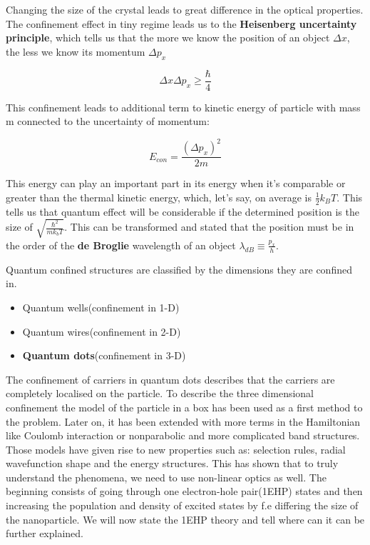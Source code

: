 Changing the size of the crystal leads to great difference in the optical properties. The confinement effect in tiny regime leads us to the \textbf{Heisenberg uncertainty principle}, which tells us that the more we know the position of an object $\Delta x$, the less we know its momentum $\Delta p_x$

\begin{equation}
\Delta x \Delta p_x \geq \frac{\hbar}{4}
\end{equation}

This confinement leads to additional term to kinetic energy of particle with mass m connected to the uncertainty of momentum:

\begin{equation}
E_{con} = \frac{(\Delta p_x)^2}{2m}
\end{equation}

This energy can play an important part in its energy when it's comparable or greater than the thermal kinetic energy, which, let's say, on average is $\frac{1}{2}k_BT$.
This tells us that quantum effect will be considerable if the determined position is the size of $\sqrt{\frac{\hbar ^2}{mk_bT}}$. This can be transformed and stated that the position must be in the order of the \textbf{de Broglie} wavelength of an object $\lambda_{dB} \equiv \frac{p_x}{h}$.

Quantum confined structures are classified by the dimensions they are confined in.

\begin{itemize}
\item Quantum wells(confinement in 1-D)
\item Quantum wires(confinement in 2-D)
\item \textbf{Quantum dots}(confinement in 3-D)
\end{itemize}

The confinement of carriers in quantum dots describes that the carriers are completely localised on the particle. To describe the three dimensional confinement the model of the particle in a box has been used as a first method to the problem. Later on, it has been extended with more terms in the Hamiltonian like Coulomb interaction or nonparabolic and more complicated band structures. Those models have given rise to new properties such as: selection rules, radial wavefunction shape and the energy structures. This has shown that to truly understand the phenomena, we need to use non-linear optics as well. The beginning consists of going through one electron-hole pair(1EHP) states and then increasing the population and density of excited states by f.e differing the size of the nanoparticle. We will now state the 1EHP theory and tell where can it can be further explained. 

